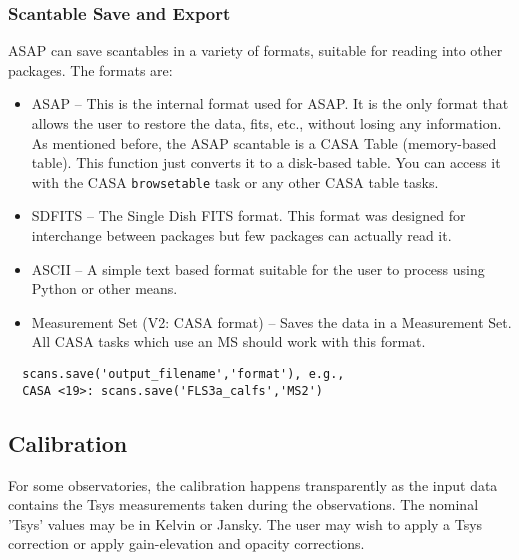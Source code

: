 \subsubsection{Scantable Save and Export}
\label{subsubsection:sd.asap.scantable.export}

ASAP can save scantables in a variety of formats, suitable for reading
into other packages. The formats are: 

\begin{itemize}
    \item ASAP -- This is the internal format used for ASAP. It is the only
     format that allows the user to restore the data, fits, etc.,
     without losing any information. As mentioned before, the ASAP
     scantable is a CASA Table (memory-based table). This function
     just converts it to a disk-based table. You can access it with
     the CASA {\tt browsetable} task or any other CASA table tasks. 

   \item SDFITS -- The Single Dish FITS format. This format was designed
     for interchange between packages but few packages can actually
     read it. 

   \item ASCII -- A simple text based format suitable for the user to
     process using Python or other means. 

   \item Measurement Set (V2: CASA format) -- Saves the data in a
     Measurement Set. All CASA tasks which use an MS should work with this format.
\end{itemize}

\small
\begin{verbatim}
  scans.save('output_filename','format'), e.g.,
  CASA <19>: scans.save('FLS3a_calfs','MS2')
\end{verbatim}
\normalsize

\subsection{Calibration}
\label{subsection:sd.asap.calib}

For some observatories, the calibration happens transparently as the
input data contains the Tsys measurements taken during the
observations. The nominal 'Tsys' values may be in Kelvin or
Jansky. The user may wish to apply a Tsys correction or apply
gain-elevation and opacity corrections.

